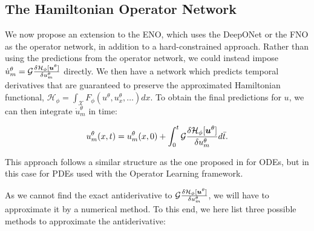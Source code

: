 \subsection{The Hamiltonian Operator Network}

We now propose an extension to the ENO, which uses the DeepONet or the FNO as the operator network, in addition to a hard-constrained approach.
Rather than using the predictions from the operator network, we could instead impose \(\dot{u}_m^\theta = \mathcal{G} \frac{\delta \mathcal{H}_\phi[\bm{u}^\theta]}{\delta u_m^\theta}\) directly.
We then have a network which predicts temporal derivatives that are guaranteed to preserve the approximated Hamiltonian functional, \(\mathcal{H}_\phi = \int_{\mathcal{X}}F_\phi(u^\theta, u_x^\theta, \ldots) dx\). 
To obtain the final predictions for \(u\), we can then integrate \(\dot{u}_m^\theta\) in time:

\begin{equation}
    u_m^\theta(x,t) = u_m^\theta(x,0) + \int_0^t \mathcal{G} \frac{\delta \mathcal{H}_\phi[\bm{u}^\theta]}{\delta u_m^\theta} d\bar{t}.
    \label{eq:hard_constrained_approach}
\end{equation}

This approach follows a similar structure as the one proposed in \cite{greydanusHamiltonianNeuralNetworks2019} for ODEs,
but in this case for PDEs used with the Operator Learning framework.

As we cannot find the exact antiderivative to \(\mathcal{G} \frac{\delta \mathcal{H}_\phi[\bm{u}^\theta]}{\delta u_m^\theta}\), we will have to approximate it by a numerical method.
To this end, we here list three possible methods to approximate the antiderivative:

